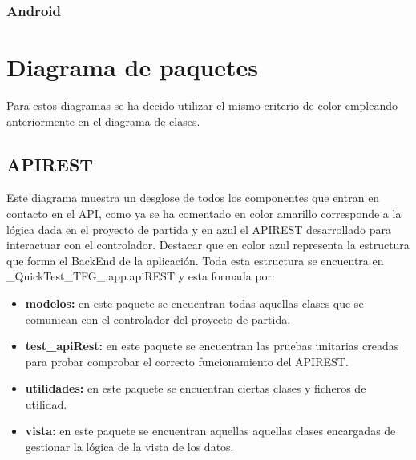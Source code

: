 
\begin{landscape}
\subsubsection{Android}
\end{landscape}



\section{Diagrama de paquetes}

Para estos diagramas se ha decido utilizar el mismo criterio de color empleando anteriormente en el diagrama de clases.

\subsection{APIREST}

Este diagrama muestra un desglose de todos los componentes que entran en contacto en el API, como ya se ha comentado en color amarillo corresponde a la lógica dada en el proyecto de partida y en azul el APIREST desarrollado para interactuar con el controlador. Destacar que en color azul representa la estructura que forma el BackEnd de la aplicación. Toda esta estructura se encuentra en  
\_QuickTest\_TFG\_.app.apiREST y esta formada por:

\begin{itemize}

	\item \textbf{modelos:} en este paquete se encuentran todas aquellas clases que se comunican con el controlador del proyecto de partida.
	\item \textbf{test\_apiRest:} en este paquete se encuentran las pruebas unitarias creadas para probar comprobar el correcto funcionamiento del APIREST.
	\item \textbf{utilidades:} en este paquete se encuentran ciertas clases y ficheros de utilidad.
	\item \textbf{vista:} en este paquete se encuentran aquellas aquellas clases encargadas de gestionar la lógica de la vista de los datos.

\end{itemize}


